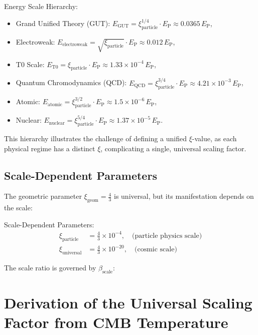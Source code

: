 \documentclass[12pt,a4paper]{report}
\newcommand{\xipar}{\xi}
\newcommand{\xiparticle}{\xi_{\text{particle}}}
\newcommand{\xiuniversal}{\xi_{\text{universal}}}
\newcommand{\xigeom}{\xi_{\text{geom}}}
\newcommand{\EP}{E_{\text{P}}}
\newcommand{\betascale}{\beta_{\text{scale}}}
\theoremstyle{definition}
\begin{document}
	\begin{unification}
		Energy Scale Hierarchy:
		\begin{itemize}
			\item Grand Unified Theory (GUT): \(E_{\text{GUT}} = \xiparticle^{1/4} \cdot \EP \approx 0.0365 \, \EP\),
			\item Electroweak: \(E_{\text{electroweak}} = \sqrt{\xiparticle} \cdot \EP \approx 0.012 \, \EP\),
			\item T0 Scale: \(E_{\text{T0}} = \xiparticle \cdot \EP \approx 1.33 \times 10^{-4} \, \EP\),
			\item Quantum Chromodynamics (QCD): \(E_{\text{QCD}} = \xiparticle^{3/4} \cdot \EP \approx 4.21 \times 10^{-3} \, \EP\),
			\item Atomic: \(E_{\text{atomic}} = \xiparticle^{3/2} \cdot \EP \approx 1.5 \times 10^{-6} \, \EP\),
			\item Nuclear: \(E_{\text{nuclear}} = \xiparticle^{5/4} \cdot \EP \approx 1.37 \times 10^{-5} \, \EP\).
		\end{itemize}
	\end{unification}
	
	This hierarchy illustrates the challenge of defining a unified \(\xipar\)-value, as each physical regime has a distinct \(\xipar\), complicating a single, universal scaling factor.
	
	\section{Scale-Dependent Parameters}
	\label{sec:scale_parameters}
	
	The geometric parameter \(\xigeom = \frac{4}{3}\) is universal, but its manifestation depends on the scale:
	
	\begin{unification}
		Scale-Dependent Parameters:
		\begin{align}
			\xiparticle &= \frac{4}{3} \times 10^{-4}, \quad \text{(particle physics scale)} \\
			\xiuniversal &= \frac{4}{3} \times 10^{-20}, \quad \text{(cosmic scale)}
		\end{align}
	\end{unification}
	
	The scale ratio is governed by \(\betascale\):
	
	\chapter{Derivation of the Universal Scaling Factor from CMB Temperature}
	\label{chap:cmb_derivation}
	
\end{document}
